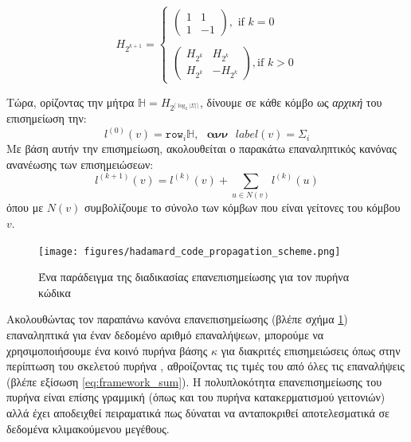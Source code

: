 \begin{equation}
H_{2^{k+1}}= \begin{cases}
\begin{pmatrix}
    1 & 1\\
    1 & -1
\end{pmatrix},\text{ if }k = 0
\\\\
\begin{pmatrix}
    H_{2^{k}} & H_{2^{k}}\\
    H_{2^{k}} & -H_{2^{k}}
\end{pmatrix},\text{if } k > 0
\end{cases}
\end{equation}

Τώρα, ορίζοντας την μήτρα  $\mathbb{H} = H_{2^{\lceil \log_{2}|\Sigma|\rceil}}$, δίνουμε σε κάθε κόμβο ως \textit{αρχική} του επισημείωση την:
\begin{equation}
l^{(0)}(v) = \mathtt{row}_{i}\mathbb{H},\text{ }\textbf{ανν}\text{ }label(v) = \Sigma_{i}
\end{equation}
Με βάση αυτήν την επισημείωση, ακολουθείται ο παρακάτω επαναληπτικός κανόνας ανανέωσης των επισημειώσεων:
\begin{equation}
l^{(k+1)}(v) = l^{(k)}(v) + \sum_{u \in N(v)}l^{(k)}(u)
\end{equation}
όπου με $N(v)$ συμβολίζουμε το σύνολο των κόμβων που είναι γείτονες του κόμβου $v$.

\begin{figure}[]
\centering
\texttt{[image: figures/hadamard\_code\_propagation\_scheme.png]}
\caption{Ένα παράδειγμα της διαδικασίας επανεπισημείωσης για τον πυρήνα κώδικα }
\label{fig:hd_ps}
\end{figure}

Ακολουθώντας τον παραπάνω κανόνα επανεπισημείωσης (βλέπε σχήμα \ref{fig:hd_ps}) επαναληπτικά για έναν δεδομένο αριθμό επαναλήψεων, μπορούμε να χρησιμοποιήσουμε ένα κοινό πυρήνα βάσης $\kappa$ για διακριτές επισημειώσεις όπως στην περίπτωση του σκελετού πυρήνα , αθροίζοντας τις τιμές του από όλες τις επαναλήψεις (βλέπε εξίσωση \ref{eq:framework_sum}).
Η πολυπλοκότητα επανεπισημείωσης του πυρήνα  είναι επίσης γραμμική (όπως και του πυρήνα κατακερματισμού γειτονιών) αλλά έχει αποδειχθεί πειραματικά πως δύναται να ανταποκριθεί αποτελεσματικά σε δεδομένα κλιμακούμενου μεγέθους.

